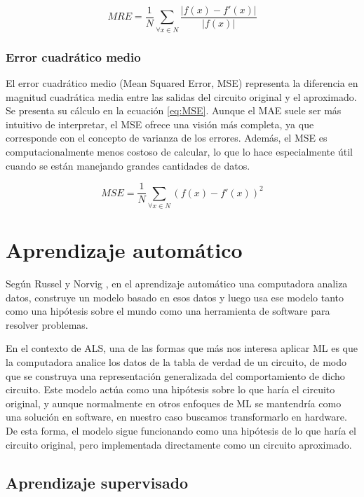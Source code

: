 \begin{equation} \label{eq:MRE}
  MRE = \frac{1}{N} \sum_{\forall x \in N} \frac{ \left| f(x) - f'(x) \right| }{ \left| f(x) \right| }
\end{equation}

\subsubsection{Error cuadrático medio}

El error cuadrático medio (Mean Squared Error, MSE) representa la diferencia en
magnitud cuadrática media entre las salidas del circuito original y el
aproximado. Se presenta su cálculo en la ecuación \ref{eq:MSE}. Aunque el MAE
suele ser más intuitivo de interpretar, el MSE ofrece una visión más completa,
ya que corresponde con el concepto de varianza de los errores. Además, el MSE
es computacionalmente menos costoso de calcular, lo que lo hace especialmente
útil cuando se están manejando grandes cantidades de datos.

\begin{equation} \label{eq:MSE}
  MSE = \frac{1}{N} \sum_{\forall x \in N} \left( f(x) - f'(x) \right)^2
\end{equation}

\section{Aprendizaje automático}

Según Russel y Norvig \cite{russell2016artificial}, en el aprendizaje
automático una computadora analiza datos, construye un modelo basado en esos
datos y luego usa ese modelo tanto como una hipótesis sobre el mundo como una
herramienta de software para resolver problemas.

En el contexto de ALS, una de las formas que más nos interesa aplicar ML es
que la computadora analice los datos de la tabla de verdad de un circuito,
de modo que se construya una representación generalizada del comportamiento de
dicho circuito.
Este modelo actúa como una hipótesis sobre lo que haría el circuito original, y
aunque normalmente en otros enfoques de ML se mantendría como una solución en
software, en nuestro caso buscamos transformarlo en hardware. De esta forma, el
modelo sigue funcionando como una hipótesis de lo que haría el circuito
original, pero implementada directamente como un circuito aproximado.

\subsection{Aprendizaje supervisado}

